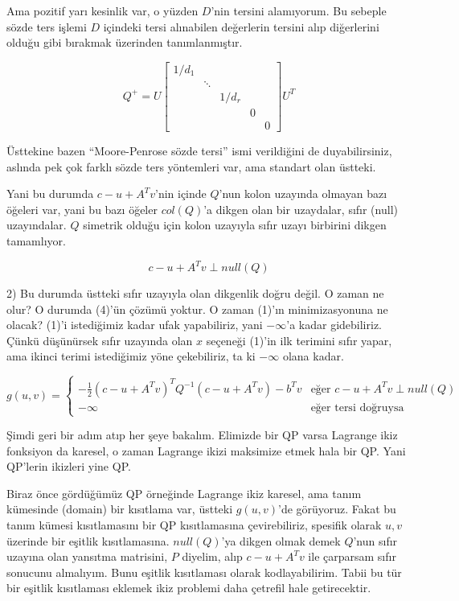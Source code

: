 \documentclass[12pt,fleqn]{article}\usepackage{../../common}
\begin{document}
Ama pozitif yarı kesinlik var, o yüzden $D$'nin tersini alamıyorum. Bu
sebeple sözde ters işlemi $D$ içindeki tersi alınabilen değerlerin tersini
alıp diğerlerini olduğu gibi bırakmak üzerinden tanımlanmıştır. 

$$
Q^+ = U \left[\begin{array}{ccccc}
1/d_1 & & & & \\
& \ddots & & & \\
& & 1/d_r & & \\
& &  & 0 & \\
& &  &  & 0 
\end{array}\right]
U^T
$$

Üsttekine bazen ``Moore-Penrose sözde tersi'' ismi verildiğini de
duyabilirsiniz, aslında pek çok farklı sözde ters yöntemleri var, ama
standart olan üstteki.

Yani bu durumda $c-u+A^T v$'nin içinde $Q$'nun kolon uzayında olmayan bazı
öğeleri var, yani bu bazı öğeler $col(Q)$'a dikgen olan bir uzaydalar,
sıfır (null) uzayındalar. $Q$ simetrik olduğu için kolon uzayıyla sıfır
uzayı birbirini dikgen tamamlıyor.

$$
c-u+A^T v \perp null(Q)
$$

2) Bu durumda üstteki sıfır uzayıyla olan dikgenlik doğru değil. O zaman ne
olur? O durumda (4)'ün çözümü yoktur. O zaman (1)'ın minimizasyonuna ne
olacak? (1)'i istediğimiz kadar ufak yapabiliriz, yani $-\infty$'a kadar
gidebiliriz. Çünkü düşünürsek sıfır uzayında olan $x$ seçeneği (1)'in ilk
terimini sıfır yapar, ama ikinci terimi istediğimiz yöne çekebiliriz, ta ki
$-\infty$ olana kadar.

$$
g(u,v) = 
\left\{ \begin{array}{ll}
-\frac{1}{2} (c - u + A^Tv)^T Q^{-1}  (c - u + A^Tv) - b^Tv & 
  \textrm{eğer } c - u + A^Tv \perp null(Q)\\
-\infty & \textrm{eğer tersi doğruysa}
\end{array} \right.
$$

Şimdi geri bir adım atıp her şeye bakalım. Elimizde bir QP varsa Lagrange
ikiz fonksiyon da karesel, o zaman Lagrange ikizi maksimize etmek hala bir
QP. Yani QP'lerin ikizleri yine QP. 

Biraz önce gördüğümüz QP örneğinde Lagrange ikiz karesel, ama tanım
kümesinde (domain) bir kısıtlama var, üstteki $g(u,v)$'de görüyoruz. Fakat
bu tanım kümesi kısıtlamasını bir QP kısıtlamasına çevirebiliriz, spesifik
olarak $u,v$ üzerinde bir eşitlik kısıtlamasına. $null(Q)$'ya dikgen olmak
demek $Q$'nun sıfır uzayına olan yansıtma matrisini, $P$ diyelim, alıp
$c - u + A^Tv$ ile çarparsam sıfır sonucunu almalıyım. Bunu eşitlik
kısıtlaması olarak kodlayabilirim. Tabii bu tür bir eşitlik kısıtlaması
eklemek ikiz problemi daha çetrefil hale getirecektir.
\end{document}
